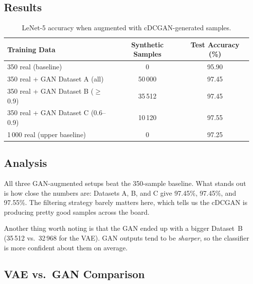 \documentclass[12pt, a4paper]{article}
\renewcommand{\arraystretch}{1.12}
\begin{document}
\subsection{Results}

\begin{table}[H]
\centering
\renewcommand{\arraystretch}{1.3}
\begin{tabular}{l c c}
\toprule
\textbf{Training Data} & \textbf{Synthetic Samples} & \textbf{Test Accuracy (\%)} \\
\midrule
350 real (baseline)                & 0       & 95.90 \\
350 real + GAN Dataset A (all)     & 50\,000 & 97.45 \\
350 real + GAN Dataset B ($\geq$0.9)   & 35\,512   & 97.45 \\
350 real + GAN Dataset C (0.6--0.9)    & 10\,120   & 97.55 \\
\midrule
1\,000 real (upper baseline)       & 0       & 97.25 \\
\bottomrule
\end{tabular}
\caption{LeNet-5 accuracy when augmented with cDCGAN-generated samples.}
\label{tab:gan_results}
\end{table}

\subsection{Analysis}

All three GAN-augmented setups beat the 350-sample baseline.  What stands out is how
close the numbers are: Datasets A, B, and C give 97.45\%, 97.45\%, and 97.55\%.
The filtering strategy barely matters here, which tells us the cDCGAN is producing
pretty good samples across the board.

Another thing worth noting is that the GAN ended up with a bigger Dataset~B
(35\,512 vs.\ 32\,968 for the VAE).  GAN outputs tend to be \emph{sharper}, so the
classifier is more confident about them on average.

\subsection{VAE vs.\ GAN Comparison}
\end{document}
